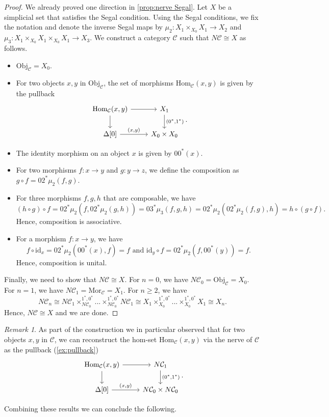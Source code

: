 \documentclass[11pt, a4paper]{amsart}
\newcommand{\cC}{\mathcal{C}}
\newcommand{\Hom}{\mathrm{Hom}}
\newcommand{\Mor}{\mathrm{Mor}}
\newcommand{\id}{\mathrm{id}}
\newcommand{\Obj}{\mathrm{Obj}}
\theoremstyle{definition}
\theoremstyle{remark}
\newtheorem{remark}[equation]{Remark}
\numberwithin{equation}{section}
\begin{document}
\begin{proof}
 We already proved one direction in \cref{prop:nerve Segal}. Let $X$ be a simplicial set that satisfies the Segal condition. Using the Segal conditions, we fix the notation and denote the inverse Segal maps by $\mu_2\colon X_1 \times_{X_0} X_1 \to X_2$ and $\mu_3\colon X_1 \times_{X_0} X_1 \times_{X_0} X_1 \to X_3$. We construct a category $\cC$ such that $N\cC \cong X$ as follows.
\begin{itemize}[leftmargin=*]
  \item $\Obj_{\cC} = X_0$.
  \item For two objects $x,y$ in $\Obj_{\cC}$, the set of morphisms $\Hom_{\cC}(x,y)$ is given by the pullback
  \[
  \begin{tikzcd}
   \Hom_{\cC}(x,y) \arrow[r] \arrow[d] & X_1 \arrow[d, "{(0^*,1^*)}"] \\
   \Delta[0] \arrow[r, "{(x,y)}"] & X_0 \times X_0
  \end{tikzcd}.
  \]
  \item The identity morphism on an object $x$ is given by $00^*(x)$.
  \item For two morphisms $f\colon x \to y$ and $g\colon y \to z$, we define the composition as $g \circ f = 02^*\mu_2(f,g)$.
  \item For three morphisms $f,g,h$ that are composable, we have 
  \[(h \circ g) \circ f = 02^*\mu_2(f,02^*\mu_2(g,h)) = 03^*\mu_3(f,g,h) = 02^*\mu_2(02^*\mu_2(f,g),h) = h \circ (g \circ f).\] 
  Hence, composition is associative.
  \item For a morphism $f\colon x \to y$, we have 
  \[f \circ \id_x = 02^*\mu_2(00^*(x),f) = f \text{ and } \id_y \circ f = 02^*\mu_2(f,00^*(y)) = f.\] 
  Hence, composition is unital.
\end{itemize}
  Finally, we need to show that $N\cC \cong X$. For $n = 0$, we have $N\cC_0 = \Obj_{\cC} = X_0$. For $n = 1$, we have $N\cC_1 = \Mor_{\cC} = X_1$. For $n \geq 2$, we have 
  \[N\cC_n \cong N\cC_1 \times_{N\cC_0}^{1^*,0^*} ... \times_{N\cC_0}^{1^*,0^*} N\cC_1 \cong X_1 \times_{X_0}^{1^*,0^*} ... \times_{X_0}^{1^*,0^*} X_1 \cong X_n. \]
  Hence, $N\cC \cong X$ and we are done.
\end{proof}

\begin{remark} \label{rem:nerve hom set}
  As part of the construction we in particular observed that for two objects $x,y$ in $\cC$, we can reconstruct the hom-set $\Hom_{\cC}(x,y)$ via the nerve of $\cC$ as the pullback (\cref{ex:pullback})
  \[
  \begin{tikzcd}
   \Hom_{\cC}(x,y) \arrow[r] \arrow[d] & N\cC_1 \arrow[d, "{(0^*,1^*)}"] \\
   \Delta[0] \arrow[r, "{(x,y)}"] & N\cC_0 \times N\cC_0
  \end{tikzcd}.
  \]
\end{remark}
Combining these results we can conclude the following.
\end{document}
